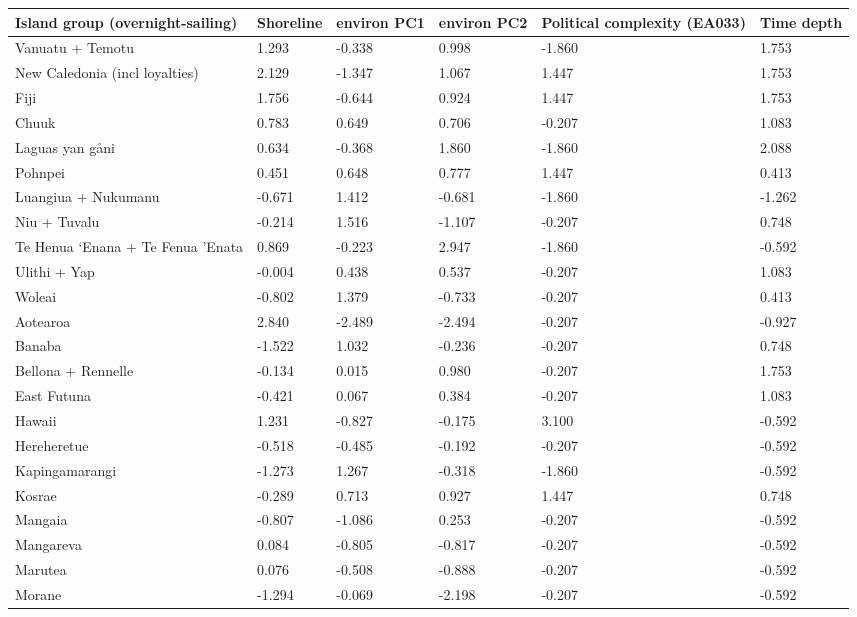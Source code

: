 \begin{longtable}{p{4.5cm}p{2cm}p{2cm}p{2cm}p{4cm}p{4cm}}
  \toprule
Island group (overnight-sailing) & Shoreline & environ PC1 & environ PC2 & Political complexity (EA033) & Time depth \\ 
  \midrule
Vanuatu + Temotu & 1.293 & -0.338 & 0.998 & -1.860 & 1.753 \\ 
  New Caledonia (incl loyalties) & 2.129 & -1.347 & 1.067 & 1.447 & 1.753 \\ 
  Fiji & 1.756 & -0.644 & 0.924 & 1.447 & 1.753 \\ 
  Chuuk & 0.783 & 0.649 & 0.706 & -0.207 & 1.083 \\ 
  Laguas yan gåni & 0.634 & -0.368 & 1.860 & -1.860 & 2.088 \\ 
  Pohnpei & 0.451 & 0.648 & 0.777 & 1.447 & 0.413 \\ 
  Luangiua + Nukumanu & -0.671 & 1.412 & -0.681 & -1.860 & -1.262 \\ 
  Niu + Tuvalu & -0.214 & 1.516 & -1.107 & -0.207 & 0.748 \\ 
  Te Henua ‘Enana + Te Fenua ’Enata & 0.869 & -0.223 & 2.947 & -1.860 & -0.592 \\ 
  Ulithi + Yap & -0.004 & 0.438 & 0.537 & -0.207 & 1.083 \\ 
  Woleai & -0.802 & 1.379 & -0.733 & -0.207 & 0.413 \\ 
  Aotearoa & 2.840 & -2.489 & -2.494 & -0.207 & -0.927 \\ 
  Banaba & -1.522 & 1.032 & -0.236 & -0.207 & 0.748 \\ 
  Bellona + Rennelle & -0.134 & 0.015 & 0.980 & -0.207 & 1.753 \\ 
  East Futuna & -0.421 & 0.067 & 0.384 & -0.207 & 1.083 \\ 
  Hawaii & 1.231 & -0.827 & -0.175 & 3.100 & -0.592 \\ 
  Hereheretue & -0.518 & -0.485 & -0.192 & -0.207 & -0.592 \\ 
  Kapingamarangi & -1.273 & 1.267 & -0.318 & -1.860 & -0.592 \\ 
  Kosrae & -0.289 & 0.713 & 0.927 & 1.447 & 0.748 \\ 
  Mangaia & -0.807 & -1.086 & 0.253 & -0.207 & -0.592 \\ 
  Mangareva & 0.084 & -0.805 & -0.817 & -0.207 & -0.592 \\ 
  Marutea & 0.076 & -0.508 & -0.888 & -0.207 & -0.592 \\ 
  Morane & -1.294 & -0.069 & -2.198 & -0.207 & -0.592 \\ 

\end{longtable}
